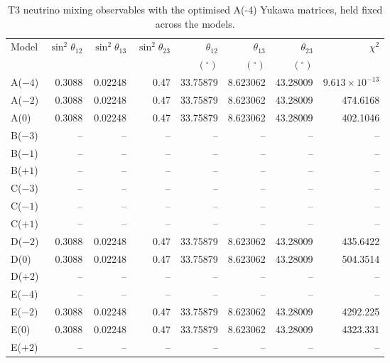 \begin{table}[p]
\centering
\caption{T3 neutrino mixing observables with the optimised A(-4) Yukawa matrices, held fixed across the models.}
\label{tab:appC_Am4_mixing}
\begingroup
\footnotesize
\setlength{\tabcolsep}{3.2pt}
\begin{tabular}{lrrrrrrr}
\hline
Model & $\sin^2\theta_{12}$ & $\sin^2\theta_{13}$ & $\sin^2\theta_{23}$ & $\theta_{12}$ & $\theta_{13}$ & $\theta_{23}$ & $\chi^2$ \\
 &  &  &  & $(^\circ)$ & $(^\circ)$ & $(^\circ)$ &  \\
\hline
A($-4$) & 0.3088 & 0.02248 & 0.47 & 33.75879 & 8.623062 & 43.28009 & $9.613\times10^{-13}$ \\
A($-2$) & 0.3088 & 0.02248 & 0.47 & 33.75879 & 8.623062 & 43.28009 & 474.6168 \\
A($0$) & 0.3088 & 0.02248 & 0.47 & 33.75879 & 8.623062 & 43.28009 & 402.1046 \\
B($-3$) & -- & -- & -- & -- & -- & -- & -- \\
B($-1$) & -- & -- & -- & -- & -- & -- & -- \\
B($+1$) & -- & -- & -- & -- & -- & -- & -- \\
C($-3$) & -- & -- & -- & -- & -- & -- & -- \\
C($-1$) & -- & -- & -- & -- & -- & -- & -- \\
C($+1$) & -- & -- & -- & -- & -- & -- & -- \\
D($-2$) & 0.3088 & 0.02248 & 0.47 & 33.75879 & 8.623062 & 43.28009 & 435.6422 \\
D($0$) & 0.3088 & 0.02248 & 0.47 & 33.75879 & 8.623062 & 43.28009 & 504.3514 \\
D($+2$) & -- & -- & -- & -- & -- & -- & -- \\
E($-4$) & -- & -- & -- & -- & -- & -- & -- \\
E($-2$) & 0.3088 & 0.02248 & 0.47 & 33.75879 & 8.623062 & 43.28009 & 4292.225 \\
E($0$) & 0.3088 & 0.02248 & 0.47 & 33.75879 & 8.623062 & 43.28009 & 4323.331 \\
E($+2$) & -- & -- & -- & -- & -- & -- & -- \\
\hline
\end{tabular}
\endgroup
\end{table}
